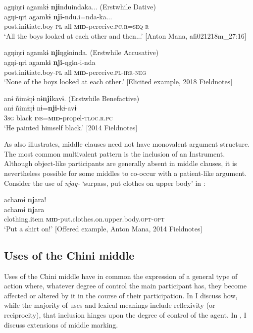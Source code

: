 \documentclass[output=paper]{langscibook}
\begin{document}
\ea\label{ex:brooks:22}
\glll agŋiŋri   agamkɨ  \textbf{nji}nduindaka...  \textup{(Erstwhile Dative)}\\
agŋi-ŋri   agamkɨ  \textbf{nji-}ndu.i=nda-ka...\\
post.initiate.boy\textsc{-pl}  all   \textbf{\textsc{mid}}\textbf{-}perceive.\textsc{pc.r=seq-r}\\
\glt `All the boys looked at each other and then...' [Anton Mana, afi021218m\_27:16]
\z


\ea\label{ex:brooks:23}
\glll agŋiŋri   agamkɨ  \textbf{nji}ŋgɨninda.  \textup{(Erstwhile Accusative)}\\
agŋi-ŋri   agamkɨ  \textbf{nji-}ŋgɨn-i-nda\\
post.initiate.boy\textsc{-pl}  all   \textbf{\textsc{mid-}}perceive\textsc{.pl-irr-neg}\\
\glt `None of the boys looked at each other.' [Elicited example, 2018 Fieldnotes]
\z

\ea\label{ex:brooks:24}
\glll anɨ  ñimɨŋɨ   nɨ\textbf{nji}kavɨ.   \textup{(Erstwhile Benefactive)}\\
anɨ  ñimɨŋɨ   nɨ=\textbf{nji-}kɨ-avɨ\\
3\textsc{sg}  black   \textsc{ins=}\textbf{\textsc{mid}}\textbf{-}propel-\textsc{tloc.r.pc}\\
\glt `He painted himself black.' [2014 Fieldnotes]
\z

As  also illustrates, middle clauses need not have monovalent argument structure. The most common multivalent pattern is the inclusion of an Instrument. Although object-like participants are generally absent in middle clauses, it is nevertheless possible for some middles to co-occur with a patient-like argument. Consider the use of \textit{njag-} ‘surpass, put clothes on upper body’ in :

\ea\label{ex:brooks:25}
\glll achamɨ  \textbf{nj}ara!\\
 achamɨ  \textbf{nj}ara\\
clothing.item  \textbf{\textsc{mid}}-put.clothes.on.upper.body.\textsc{opt-opt}\\
 \glt `Put a shirt on!' [Offered example, Anton Mana, 2014 Fieldnotes]
\z

\subsection{{Uses} {of} {the} {Chini} {middle}}\label{sec:brooks:4.2}

Uses of the Chini middle have in common the expression of a general type of action where, whatever degree of control the main participant has, they become affected or altered by it in the course of their participation. In  I discuss how, while the majority of uses and lexical meanings include reflexivity (or reciprocity), that inclusion hinges upon the degree of control of the agent. In , I discuss extensions of middle marking.
\end{document}
